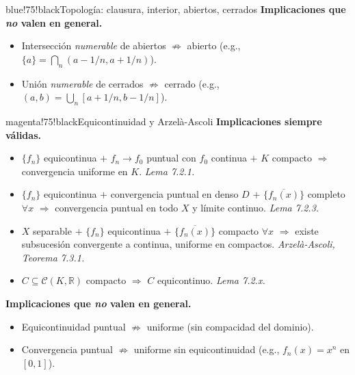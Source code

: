 \documentclass[11pt,twoside]{article}
\newcommand{\R}{\mathbb{R}}
\begin{document}
\begin{equivbox}{blue!75!black}{Topología: clausura, interior, abiertos, cerrados}
\textbf{Implicaciones que \emph{no} valen en general.}
\begin{itemize}[leftmargin=2em,itemsep=2pt]
\item Intersección \emph{numerable} de abiertos $\not\Rightarrow$ abierto (e.g., $\{a\} = \bigcap_{n} (a - 1/n, a + 1/n)$).
\item Unión \emph{numerable} de cerrados $\not\Rightarrow$ cerrado (e.g., $(a, b) = \bigcup_{n} [a + 1/n, b - 1/n]$).
\end{itemize}
\end{equivbox}

\medskip

\begin{equivbox}{magenta!75!black}{Equicontinuidad y Arzelà-Ascoli}
\textbf{Implicaciones siempre válidas.}
\begin{itemize}[leftmargin=2em,itemsep=2pt]
\item $\{f_{n}\}$ equicontinua $+$ $f_{n} \to f_{0}$ puntual con $f_{0}$ continua $+$ $K$ compacto $\Rightarrow$ convergencia uniforme en $K$. \hfill\textit{Lema 7.2.1.}
\item $\{f_{n}\}$ equicontinua $+$ convergencia puntual en denso $D$ $+$ $\overline{\{f_{n}(x)\}}$ completo $\forall x$ $\Rightarrow$ convergencia puntual en todo $X$ y límite continuo. \hfill\textit{Lema 7.2.3.}
\item $X$ separable $+$ $\{f_{n}\}$ equicontinua $+$ $\overline{\{f_{n}(x)\}}$ compacto $\forall x$ $\Rightarrow$ existe subsucesión convergente a continua, uniforme en compactos. \hfill\textit{Arzelà-Ascoli, Teorema 7.3.1.}
\item $C \subseteq \mathcal{C}(K, \R)$ compacto $\Rightarrow$ $C$ equicontinuo. \hfill\textit{Lema 7.2.x.}
\end{itemize}

\textbf{Implicaciones que \emph{no} valen en general.}
\begin{itemize}[leftmargin=2em,itemsep=2pt]
\item Equicontinuidad puntual $\not\Rightarrow$ uniforme (sin compacidad del dominio).
\item Convergencia puntual $\not\Rightarrow$ uniforme sin equicontinuidad (e.g., $f_{n}(x) = x^{n}$ en $[0, 1]$).
\end{itemize}
\end{equivbox}

\medskip
\end{document}
